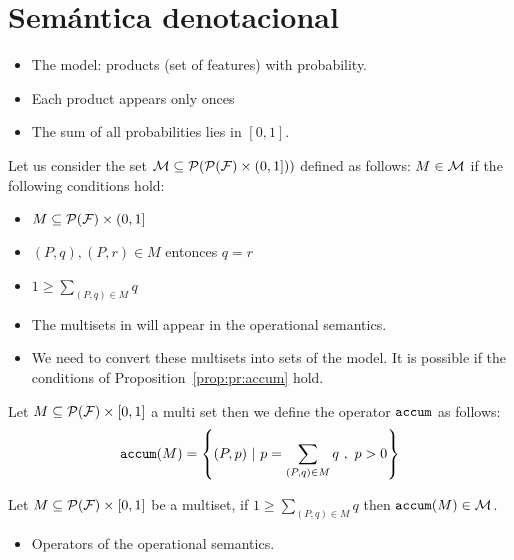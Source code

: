 \section{Semántica denotacional}
\label{sec:stat:den}

\begin{itemize}
\item The model: products (set of features) with probability.
\item Each product appears only onces
\item The sum of all probabilities lies in $[0,1]$.
\end{itemize}



\bdfn\label{def:den:pr}
  Let us consider the set ${\cal M}\subseteq{\cal P}({\cal P}({\cal F})\times
  (0,1]))$ defined as follows: $M\in{\cal M}$ if the following
  conditions hold:
  \begin{itemize}
  \item $M\subseteq {\cal P}({\cal F})\times (0,1]$ \\
  \item $(P,q),(P,r)\in M$ entonces $q=r$ \\
  \item $1\geq\sum_{(P,q)\in M} q$ \\
  \end{itemize}
\edfn

\begin{itemize}
\item The multisets in will appear in the operational semantics.
\item We need to convert these multisets into sets of the model. It is
  possible if the conditions of Proposition~\ref{prop:pr:accum} hold.
\end{itemize}

\bdfn
  Let $M \subseteq {\cal P}({\cal F})\times [0,1]$ a multi set then we
  define the operator $\mathtt{accum}$ as follows:
  $$\mathtt{accum}(M) = \left\{(P,p)\ | \ p=\sum_{(P,q)\in M}q\ ,\ p>0\right\}$$

\edfn
\bprop\label{prop:pr:accum}
 Let $M\subseteq {\cal P}({\cal F})\times [0,1]$ be a multiset, if $1\geq\sum_{(P,q)\in M} q$
 then $\mathtt{accum}(M)\in{\cal M}$.
\eprop


\begin{itemize}
\item Operators of the operational semantics.
\end{itemize}


